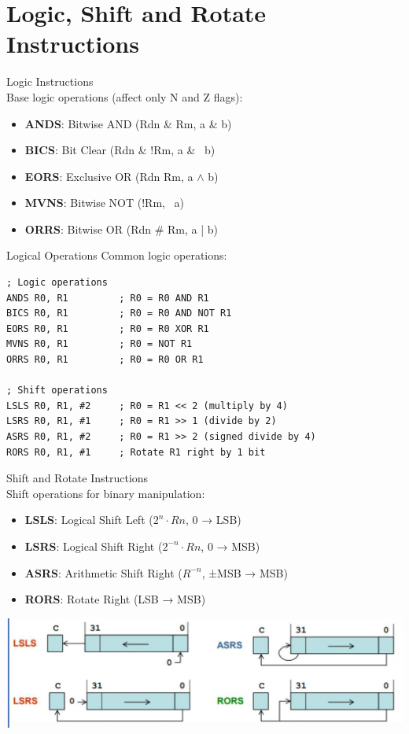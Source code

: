 \section{Logic, Shift and Rotate Instructions}

\begin{concept}{Logic Instructions}\\
Base logic operations (affect only N and Z flags):
\begin{itemize}
  \item \textbf{ANDS}: Bitwise AND (Rdn \& Rm, a \& b)
  \item \textbf{BICS}: Bit Clear (Rdn \& !Rm, a \& ~b)
  \item \textbf{EORS}: Exclusive OR (Rdn \textdollar Rm, a $\wedge$  b)
  \item \textbf{MVNS}: Bitwise NOT (!Rm, ~a)
  \item \textbf{ORRS}: Bitwise OR (Rdn \# Rm, a | b)
\end{itemize}
\end{concept}

\begin{example2}{Logical Operations}
Common logic operations:
\begin{lstlisting}[language=armasm, style=basesmol]
; Logic operations
ANDS R0, R1         ; R0 = R0 AND R1
BICS R0, R1         ; R0 = R0 AND NOT R1
EORS R0, R1         ; R0 = R0 XOR R1
MVNS R0, R1         ; R0 = NOT R1
ORRS R0, R1         ; R0 = R0 OR R1

; Shift operations
LSLS R0, R1, #2     ; R0 = R1 << 2 (multiply by 4)
LSRS R0, R1, #1     ; R0 = R1 >> 1 (divide by 2)
ASRS R0, R1, #2     ; R0 = R1 >> 2 (signed divide by 4)
RORS R0, R1, #1     ; Rotate R1 right by 1 bit
\end{lstlisting}
\end{example2}

\begin{concept}{Shift and Rotate Instructions}\\
Shift operations for binary manipulation:
\begin{itemize}
  \item \textbf{LSLS}: Logical Shift Left ($2^n \cdot Rn$, 0 → LSB)
  \item \textbf{LSRS}: Logical Shift Right ($2^{-n} \cdot Rn$, 0 → MSB)
  \item \textbf{ASRS}: Arithmetic Shift Right ($R^{-n}$, ±MSB → MSB)
  \item \textbf{RORS}: Rotate Right (LSB → MSB)
\end{itemize}

\includegraphics[width=\linewidth]{images/2024_12_29_79e6b22f503fb7b4f718g-06}
\end{concept}

